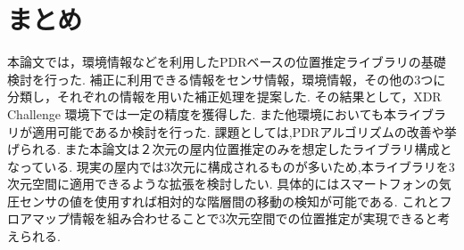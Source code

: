 

\section{まとめ}
本論文では，環境情報などを利用したPDRベースの位置推定ライブラリの基礎検討を行った.
補正に利用できる情報をセンサ情報，環境情報，その他の3つに分類し，それぞれの情報を用いた補正処理を提案した.
その結果として，XDR Challenge 環境下では一定の精度を獲得した.
また他環境においても本ライブラリが適用可能であるか検討を行った.
課題としては,PDRアルゴリズムの改善や挙げられる.
また本論文は２次元の屋内位置推定のみを想定したライブラリ構成となっている.
現実の屋内では3次元に構成されるものが多いため,本ライブラリを3次元空間に適用できるような拡張を検討したい.
具体的にはスマートフォンの気圧センサの値を使用すれば相対的な階層間の移動の検知が可能である.
これとフロアマップ情報を組み合わせることで3次元空間での位置推定が実現できると考えられる.


